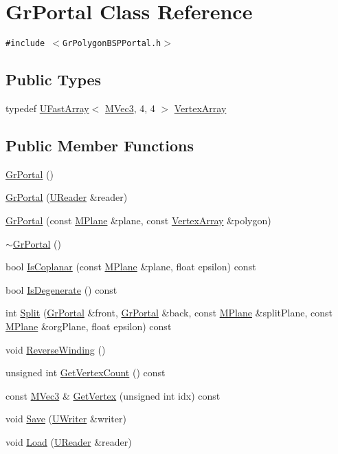 \hypertarget{class_gr_portal}{
\section{GrPortal Class Reference}
\label{class_gr_portal}
}
{\tt \#include $<$GrPolygonBSPPortal.h$>$}

\subsection*{Public Types}
\begin{CompactItemize}
\item 
typedef \hyperlink{class_u_fast_array}{UFastArray}$<$ \hyperlink{class_m_vec3}{MVec3}, 4, 4 $>$ \hyperlink{class_gr_portal_3725398b99bf9b73fda499ac8d3218c8}{VertexArray}
\end{CompactItemize}
\subsection*{Public Member Functions}
\begin{CompactItemize}
\item 
\hyperlink{class_gr_portal_6b1f01d3fa0e30c96933e25f8e9b0d9d}{GrPortal} ()
\item 
\hyperlink{class_gr_portal_7c26e2e46f6d439cc1f3ec29ca342fdc}{GrPortal} (\hyperlink{class_u_reader}{UReader} \&reader)
\item 
\hyperlink{class_gr_portal_e2b9de45071c5699887f9b0f4f3e6496}{GrPortal} (const \hyperlink{class_m_plane}{MPlane} \&plane, const \hyperlink{class_u_fast_array}{VertexArray} \&polygon)
\item 
\hyperlink{class_gr_portal_ef1e70041f3deb5646b306493a93f0d3}{$\sim$GrPortal} ()
\item 
bool \hyperlink{class_gr_portal_7b60340fcd9dd5d2f211fe3ef8da73aa}{IsCoplanar} (const \hyperlink{class_m_plane}{MPlane} \&plane, float epsilon) const 
\item 
bool \hyperlink{class_gr_portal_f315cb8bc85fbbaf5f6f6c8091e025a5}{IsDegenerate} () const 
\item 
int \hyperlink{class_gr_portal_c9be0015f4bf3300dd4e1dc7e7cbf2a0}{Split} (\hyperlink{class_gr_portal}{GrPortal} \&front, \hyperlink{class_gr_portal}{GrPortal} \&back, const \hyperlink{class_m_plane}{MPlane} \&splitPlane, const \hyperlink{class_m_plane}{MPlane} \&orgPlane, float epsilon) const 
\item 
void \hyperlink{class_gr_portal_ac50ae0eb9b06456b746a5f9350eedb7}{ReverseWinding} ()
\item 
unsigned int \hyperlink{class_gr_portal_c0d550bb52043d3e5c410f07cc6cd265}{GetVertexCount} () const 
\item 
const \hyperlink{class_m_vec3}{MVec3} \& \hyperlink{class_gr_portal_b03b8fbf1a5ab6f367cd880c81d70854}{GetVertex} (unsigned int idx) const 
\item 
void \hyperlink{class_gr_portal_6eab7a51a1a62da988b307da7a65cad8}{Save} (\hyperlink{class_u_writer}{UWriter} \&writer)
\item 
void \hyperlink{class_gr_portal_774771467d6a976f294acb74f82339cc}{Load} (\hyperlink{class_u_reader}{UReader} \&reader)
\end{CompactItemize}


